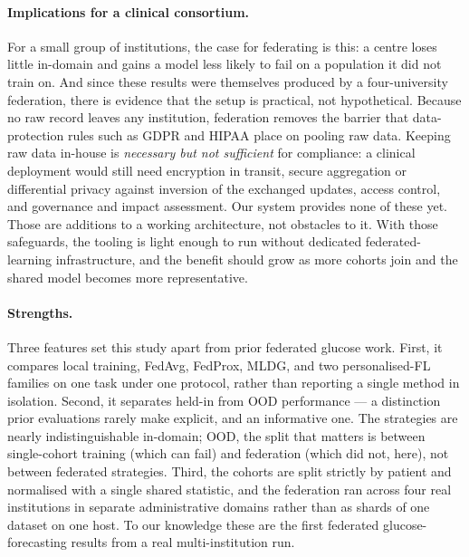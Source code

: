 \documentclass[10pt,letterpaper]{article}
\begin{document}
\paragraph{Implications for a clinical consortium.} For a small group of
institutions, the case for federating is this: a centre loses little
in-domain and gains a model less likely to fail on a population it did not
train on. And since these results were themselves produced by a
four-university federation, there is evidence that the setup is practical,
not hypothetical. Because no raw record leaves any institution, federation
removes the barrier that data-protection rules such as GDPR and HIPAA place
on pooling raw data. Keeping raw data in-house is \emph{necessary but not
sufficient} for compliance: a clinical deployment would still need encryption
in transit, secure aggregation or differential privacy against inversion of
the exchanged updates, access control, and governance and impact assessment.
Our system provides none of these yet. Those are additions to a working
architecture, not obstacles to it. With those safeguards, the tooling is
light enough to run without dedicated federated-learning infrastructure, and
the benefit should grow as more cohorts join and the shared model becomes
more representative.

\paragraph{Strengths.} Three features set this study apart from prior
federated glucose work. First, it compares local training, FedAvg, FedProx,
MLDG, and two personalised-FL families on one task under one protocol, rather
than reporting a single method in isolation. Second, it separates held-in
from OOD performance --- a distinction prior evaluations rarely make
explicit, and an informative one. The strategies are nearly indistinguishable
in-domain; OOD, the split that matters is between single-cohort training
(which can fail) and federation (which did not, here), not between federated
strategies. Third, the cohorts are split strictly by patient and normalised
with a single shared statistic, and the federation ran across four real
institutions in separate administrative domains rather than as shards of one
dataset on one host. To our knowledge these are the first federated
glucose-forecasting results from a real multi-institution run.
\end{document}
